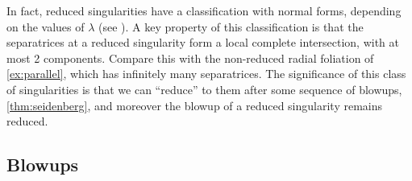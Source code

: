 In fact, reduced singularities have a classification with normal forms,
depending on the values of $\lambda$ (see \cite[\S1]{brunella_book}). A key
property of this classification is that the separatrices at a reduced
singularity form a local complete intersection, with at most 2 components.
Compare this with the non-reduced radial foliation of \cref{ex:parallel}, which
has infinitely many separatrices. The significance of this class of
singularities is that we can ``reduce'' to them after some sequence of blowups,
\cref{thm:seidenberg}, and moreover the blowup of a reduced singularity remains
reduced.

\subsection{Blowups}

